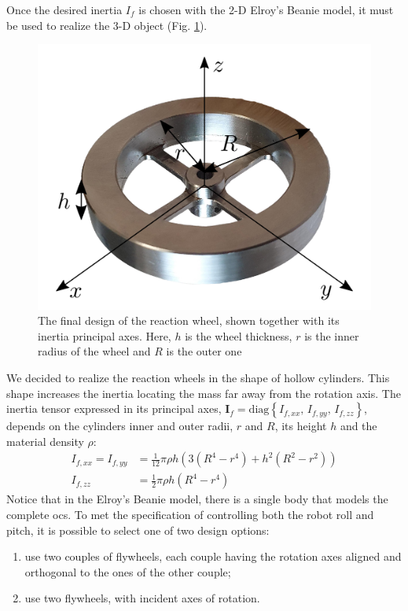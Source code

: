\documentclass[letterpaper, 10 pt, conference]{ieeeconf}  %
\begin{document}
Once the desired inertia $I_f$ is chosen with the 2-D Elroy's Beanie model, it must be used to realize the 3-D object (Fig. \ref{fig:flywheel}). 
\begin{figure}
	\centering
	\includegraphics[width=0.7\linewidth]{figures/flywheel.png}
	\caption{\small The final design of the reaction wheel, shown together with its inertia principal axes. Here, $h$ is the wheel thickness, $r$ is the inner radius of the wheel and $R$ is the outer one}
	\label{fig:flywheel}
\end{figure}
We decided to realize the reaction wheels in the shape of hollow cylinders. This shape increases the inertia locating the mass far away from the rotation axis. The inertia tensor expressed in its principal axes, $\bm{I}_f = \mathrm{diag}\left\{ I_{f, xx}, \, I_{f, yy}, \, I_{f, zz}  \right\}$, depends on the cylinders inner and outer radii, $r$ and $R$, its height $h$ and the material density $\rho$:
\begin{equation}
	\begin{split}
	I_{f, xx} = I_{f, yy} &= \frac{1}{12}\pi \rho h \left(3\left(R^4 - r^4\right) + h^2\left(R^2 - r^2\right)\right) \\
	I_{f, zz} &= \frac{1}{2}\pi \rho h \left(R^4 - r^4\right)
	\end{split}
\end{equation}
Notice that in the Elroy's Beanie model, there is a single body that models the complete \gls{ocs}. To met the specification of controlling both the robot roll and pitch, it is possible to select one of two design options:
\begin{enumerate}
	\item use two couples of flywheels, each couple having the rotation axes aligned and orthogonal to the ones of the other couple;
	\item use two flywheels, with incident axes of rotation.
\end{enumerate}
\end{document}
